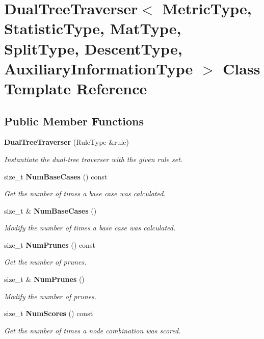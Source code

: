 \section{Dual\+Tree\+Traverser$<$ Metric\+Type, Statistic\+Type, Mat\+Type, Split\+Type, Descent\+Type, Auxiliary\+Information\+Type $>$ Class Template Reference}
\label{classmlpack_1_1tree_1_1RectangleTree_1_1DualTreeTraverser}
\subsection*{Public Member Functions}
\begin{DoxyCompactItemize}
\item 
\textbf{ Dual\+Tree\+Traverser} (Rule\+Type \&rule)
\begin{DoxyCompactList}\small\item\em Instantiate the dual-\/tree traverser with the given rule set. \end{DoxyCompactList}\item 
size\+\_\+t \textbf{ Num\+Base\+Cases} () const
\begin{DoxyCompactList}\small\item\em Get the number of times a base case was calculated. \end{DoxyCompactList}\item 
size\+\_\+t \& \textbf{ Num\+Base\+Cases} ()
\begin{DoxyCompactList}\small\item\em Modify the number of times a base case was calculated. \end{DoxyCompactList}\item 
size\+\_\+t \textbf{ Num\+Prunes} () const
\begin{DoxyCompactList}\small\item\em Get the number of prunes. \end{DoxyCompactList}\item 
size\+\_\+t \& \textbf{ Num\+Prunes} ()
\begin{DoxyCompactList}\small\item\em Modify the number of prunes. \end{DoxyCompactList}\item 
size\+\_\+t \textbf{ Num\+Scores} () const
\begin{DoxyCompactList}\small\item\em Get the number of times a node combination was scored. \end{DoxyCompactList}\item 

\end{DoxyCompactItemize}
